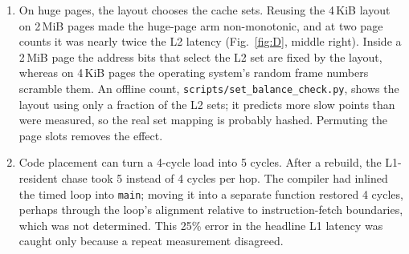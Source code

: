 \documentclass{article}
\begin{document}
\begin{enumerate}
  \item On huge pages, the layout chooses the cache sets. Reusing the 4\,KiB layout on 2\,MiB pages made the huge-page arm non-monotonic, and at two page counts it was nearly twice the L2 latency (Fig.~\ref{fig:D}, middle right). Inside a 2\,MiB page the address bits that select the L2 set are fixed by the layout, whereas on 4\,KiB pages the operating system's random frame numbers scramble them. An offline count, \texttt{scripts/set\_balance\_check.py}, shows the layout using only a fraction of the L2 sets; it predicts more slow points than were measured, so the real set mapping is probably hashed. Permuting the page slots removes the effect.
  \item Code placement can turn a 4-cycle load into 5 cycles. After a rebuild, the L1-resident chase took 5 instead of 4 cycles per hop. The compiler had inlined the timed loop into \texttt{main}; moving it into a separate function restored 4 cycles, perhaps through the loop's alignment relative to instruction-fetch boundaries, which was not determined. This 25\% error in the headline L1 latency was caught only because a repeat measurement disagreed.
\end{enumerate}
\end{document}
